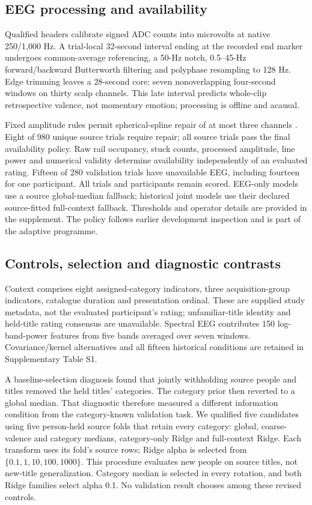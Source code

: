 \documentclass[11pt,a4paper]{article}
\begin{document}
\subsection{EEG processing and availability}
Qualified headers calibrate signed ADC counts into microvolts at native 250/1,000 Hz. A trial-local 32-second interval ending at the recorded end marker undergoes common-average referencing, a 50-Hz notch, 0.5--45-Hz forward/backward Butterworth filtering and polyphase resampling to 128 Hz. Edge trimming leaves a 28-second core: seven nonoverlapping four-second windows on thirty scalp channels. This late interval predicts whole-clip retrospective valence, not momentary emotion; processing is offline and acausal.

Fixed amplitude rules permit spherical-spline repair of at most three channels \cite{perrin1989spherical}. Eight of 980 unique source trials require repair; all source trials pass the final availability policy. Raw rail occupancy, stuck counts, processed amplitude, line power and numerical validity determine availability independently of an evaluated rating. Fifteen of 280 validation trials have unavailable EEG, including fourteen for one participant. All trials and participants remain scored. EEG-only models use a source global-median fallback; historical joint models use their declared source-fitted full-context fallback. Thresholds and operator details are provided in the supplement. The policy follows earlier development inspection and is part of the adaptive programme.

\subsection{Controls, selection and diagnostic contrasts}
Context comprises eight assigned-category indicators, three acquisition-group indicators, catalogue duration and presentation ordinal. These are supplied study metadata, not the evaluated participant's rating; unfamiliar-title identity and held-title rating consensus are unavailable. Spectral EEG contributes 150 log-band-power features from five bands averaged over seven windows. Covariance/kernel alternatives and all fifteen historical conditions are retained in Supplementary Table S1.

A baseline-selection diagnosis found that jointly withholding source people and titles removed the held titles' categories. The category prior then reverted to a global median. That diagnostic therefore measured a different information condition from the category-known validation task. We qualified five candidates using five person-held source folds that retain every category: global, coarse-valence and category medians, category-only Ridge and full-context Ridge. Each transform uses its fold's source rows; Ridge alpha is selected from \(\{0.1,1,10,100,1000\}\). This procedure evaluates new people on source titles, not new-title generalization. Category median is selected in every rotation, and both Ridge families select alpha 0.1. No validation result chooses among these revised controls.
\end{document}
